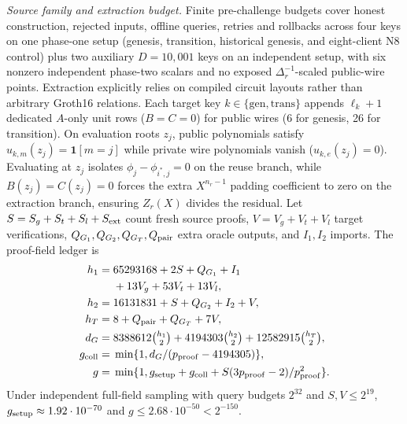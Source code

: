 \documentclass[conference,compsoc]{IEEEtran}
\theoremstyle{definition}
\numberwithin{equation}{section}
\numberwithin{table}{section}
\numberwithin{figure}{section}
\theoremstyle{plain}
\begin{document}
\par\noindent\emph{Source family and extraction budget.}
\label{app:primitive-reductions}
Finite pre-challenge budgets cover honest construction, rejected inputs, offline queries, retries and rollbacks across four keys on one phase-one setup (genesis, transition, historical genesis, and eight-client N8 control) plus two auxiliary \(D=10{,}001\) keys on an independent setup, with six nonzero independent phase-two scalars and no exposed \(\Delta_r^{-1}\)-scaled public-wire points. Extraction explicitly relies on compiled circuit layouts rather than arbitrary Groth16 relations. Each target key \(k\in\{\mathrm{gen},\mathrm{trans}\}\) appends \(\ell_k+1\) dedicated \(A\)-only unit rows (\(B=C=0\)) for public wires (6 for genesis, 26 for transition). On evaluation roots \(z_j\), public polynomials satisfy \(u_{k,m}(z_j)=\mathbf 1[m=j]\) while private wire polynomials vanish (\(u_{k,e}(z_j)=0\)). Evaluating at \(z_j\) isolates \(\phi_j-\phi_{i^*,j}=0\) on the reuse branch, while \(B(z_j)=C(z_j)=0\) forces the extra \(X^{n_r-1}\) padding coefficient to zero on the extraction branch, ensuring \(Z_r(X)\) divides the residual. Let \(S=S_g+S_t+S_l+S_{\rm ext}\) count fresh source proofs, \(V=V_g+V_t+V_l\) target verifications, \(Q_{G_1},Q_{G_2},Q_{G_T},Q_{\rm pair}\) extra oracle outputs, and \(I_1,I_2\) imports. The proof-field ledger is
\begin{align}
 h_1={}&65293168+2S+Q_{G_1}+I_1\notag\\
       &+13V_g+53V_t+13V_l,\notag\\
 h_2={}&16131831+S+Q_{G_2}+I_2+V,\notag\\
 h_T={}&8+Q_{\rm pair}+Q_{G_T}+7V,\notag\\
 d_G={}&8388612\tbinom{h_1}{2}+4194303\tbinom{h_2}{2}+12582915\tbinom{h_T}{2},\notag\\
 g_{\rm coll}={}&\min\{1,d_G/(p_{\rm proof}-4194305)\},\notag\\
 g={}&\min\{1,g_{\rm setup}+g_{\rm coll}+S(3p_{\rm proof}-2)/p_{\rm proof}^2\}.
 \label{eq:groth-budget}
\end{align}
Under independent full-field sampling with query budgets \(2^{32}\) and \(S,V \le 2^{19}\), \(g_{\rm setup} \approx 1.92 \cdot 10^{-70}\) and \(g \le 2.68 \cdot 10^{-50} < 2^{-150}\).
\end{document}
